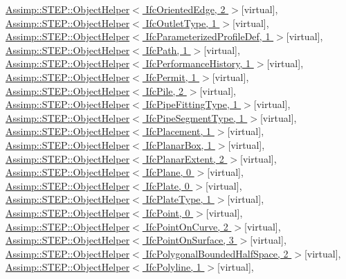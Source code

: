 \hyperlink{struct_assimp_1_1_s_t_e_p_1_1_object_helper}{Assimp\+::\+S\+T\+E\+P\+::\+Object\+Helper$<$ Ifc\+Oriented\+Edge, 2 $>$}{\ttfamily  \mbox{[}virtual\mbox{]}}, \hyperlink{struct_assimp_1_1_s_t_e_p_1_1_object_helper}{Assimp\+::\+S\+T\+E\+P\+::\+Object\+Helper$<$ Ifc\+Outlet\+Type, 1 $>$}{\ttfamily  \mbox{[}virtual\mbox{]}}, \hyperlink{struct_assimp_1_1_s_t_e_p_1_1_object_helper}{Assimp\+::\+S\+T\+E\+P\+::\+Object\+Helper$<$ Ifc\+Parameterized\+Profile\+Def, 1 $>$}{\ttfamily  \mbox{[}virtual\mbox{]}}, \hyperlink{struct_assimp_1_1_s_t_e_p_1_1_object_helper}{Assimp\+::\+S\+T\+E\+P\+::\+Object\+Helper$<$ Ifc\+Path, 1 $>$}{\ttfamily  \mbox{[}virtual\mbox{]}}, \hyperlink{struct_assimp_1_1_s_t_e_p_1_1_object_helper}{Assimp\+::\+S\+T\+E\+P\+::\+Object\+Helper$<$ Ifc\+Performance\+History, 1 $>$}{\ttfamily  \mbox{[}virtual\mbox{]}}, \hyperlink{struct_assimp_1_1_s_t_e_p_1_1_object_helper}{Assimp\+::\+S\+T\+E\+P\+::\+Object\+Helper$<$ Ifc\+Permit, 1 $>$}{\ttfamily  \mbox{[}virtual\mbox{]}}, \hyperlink{struct_assimp_1_1_s_t_e_p_1_1_object_helper}{Assimp\+::\+S\+T\+E\+P\+::\+Object\+Helper$<$ Ifc\+Pile, 2 $>$}{\ttfamily  \mbox{[}virtual\mbox{]}}, \hyperlink{struct_assimp_1_1_s_t_e_p_1_1_object_helper}{Assimp\+::\+S\+T\+E\+P\+::\+Object\+Helper$<$ Ifc\+Pipe\+Fitting\+Type, 1 $>$}{\ttfamily  \mbox{[}virtual\mbox{]}}, \hyperlink{struct_assimp_1_1_s_t_e_p_1_1_object_helper}{Assimp\+::\+S\+T\+E\+P\+::\+Object\+Helper$<$ Ifc\+Pipe\+Segment\+Type, 1 $>$}{\ttfamily  \mbox{[}virtual\mbox{]}}, \hyperlink{struct_assimp_1_1_s_t_e_p_1_1_object_helper}{Assimp\+::\+S\+T\+E\+P\+::\+Object\+Helper$<$ Ifc\+Placement, 1 $>$}{\ttfamily  \mbox{[}virtual\mbox{]}}, \hyperlink{struct_assimp_1_1_s_t_e_p_1_1_object_helper}{Assimp\+::\+S\+T\+E\+P\+::\+Object\+Helper$<$ Ifc\+Planar\+Box, 1 $>$}{\ttfamily  \mbox{[}virtual\mbox{]}}, \hyperlink{struct_assimp_1_1_s_t_e_p_1_1_object_helper}{Assimp\+::\+S\+T\+E\+P\+::\+Object\+Helper$<$ Ifc\+Planar\+Extent, 2 $>$}{\ttfamily  \mbox{[}virtual\mbox{]}}, \hyperlink{struct_assimp_1_1_s_t_e_p_1_1_object_helper}{Assimp\+::\+S\+T\+E\+P\+::\+Object\+Helper$<$ Ifc\+Plane, 0 $>$}{\ttfamily  \mbox{[}virtual\mbox{]}}, \hyperlink{struct_assimp_1_1_s_t_e_p_1_1_object_helper}{Assimp\+::\+S\+T\+E\+P\+::\+Object\+Helper$<$ Ifc\+Plate, 0 $>$}{\ttfamily  \mbox{[}virtual\mbox{]}}, \hyperlink{struct_assimp_1_1_s_t_e_p_1_1_object_helper}{Assimp\+::\+S\+T\+E\+P\+::\+Object\+Helper$<$ Ifc\+Plate\+Type, 1 $>$}{\ttfamily  \mbox{[}virtual\mbox{]}}, \hyperlink{struct_assimp_1_1_s_t_e_p_1_1_object_helper}{Assimp\+::\+S\+T\+E\+P\+::\+Object\+Helper$<$ Ifc\+Point, 0 $>$}{\ttfamily  \mbox{[}virtual\mbox{]}}, \hyperlink{struct_assimp_1_1_s_t_e_p_1_1_object_helper}{Assimp\+::\+S\+T\+E\+P\+::\+Object\+Helper$<$ Ifc\+Point\+On\+Curve, 2 $>$}{\ttfamily  \mbox{[}virtual\mbox{]}}, \hyperlink{struct_assimp_1_1_s_t_e_p_1_1_object_helper}{Assimp\+::\+S\+T\+E\+P\+::\+Object\+Helper$<$ Ifc\+Point\+On\+Surface, 3 $>$}{\ttfamily  \mbox{[}virtual\mbox{]}}, \hyperlink{struct_assimp_1_1_s_t_e_p_1_1_object_helper}{Assimp\+::\+S\+T\+E\+P\+::\+Object\+Helper$<$ Ifc\+Polygonal\+Bounded\+Half\+Space, 2 $>$}{\ttfamily  \mbox{[}virtual\mbox{]}}, \hyperlink{struct_assimp_1_1_s_t_e_p_1_1_object_helper}{Assimp\+::\+S\+T\+E\+P\+::\+Object\+Helper$<$ Ifc\+Polyline, 1 $>$}{\ttfamily  \mbox{[}virtual\mbox{]}}, 